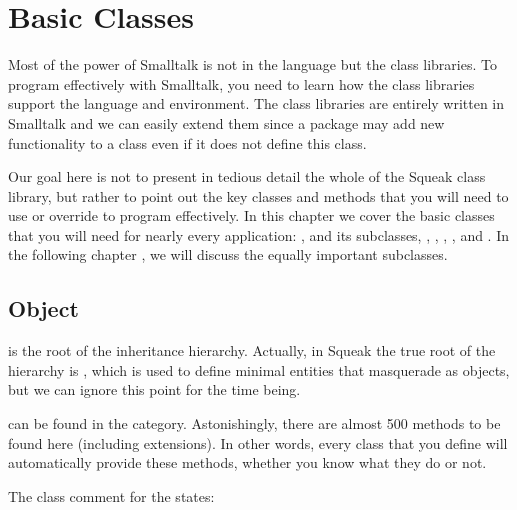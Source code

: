 \documentclass[a4paper,10pt,twoside]{book}
\begin{document}
	\renewcommand{\nnbb}[2]{} %
	\sloppy
\fi
\chapter{Basic Classes}
\label{cha:basic}

Most of the power of Smalltalk is not in the language but the class libraries.
To program effectively with Smalltalk, you need to learn how the class libraries support the language and environment.
The class libraries are entirely written in Smalltalk and we can easily extend them since a package may add new functionality to a class even if it does not define this class. 

Our goal here is not to present in tedious detail the whole of the Squeak class library, but rather to point out the key classes and methods that you will need to use or override to program effectively.
In this chapter we cover the basic classes that you will need for nearly every application: ,  and its subclasses, , , , , and . 
In the following chapter , we will discuss the equally important  subclasses.


\section{Object}
 is the root of the inheritance hierarchy.
Actually, in Squeak the true root of the hierarchy is , which is used to define minimal entities that masquerade as objects, but we can ignore this point for the time being.

 can be found in the  category.
Astonishingly, there are almost 500 methods to be found here (including extensions).
In other words, every class that you define will automatically provide these methods, whether you know what they do or not.

The class comment for the  states:
\end{document}
